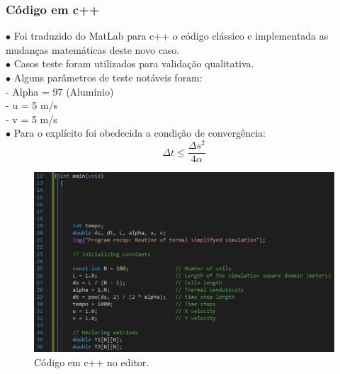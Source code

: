 \documentclass[xcolor=dvipsnames,10pt,aspectratio=169]{beamer}
\begin{document}
	\begin{frame}
		\frametitle{Código em c++}
		\begin{minipage}[h!]{0.49\textwidth}
			$\bullet$ Foi traduzido do MatLab para c++ o código clássico e implementada as mudanças matemáticas deste novo caso.\\
			$\bullet$ Casos teste foram utilizados para validação qualitativa.\\
			$\bullet$ Alguns parâmetros de teste notáveis foram: \\
			- Alpha = 97 (Alumínio) \\
			- u = 5 m/s \\
			- v = 5 m/s \\
			$\bullet$ Para o explícito foi obedecida a condição de convergência:
			\begin{equation}
				\Delta t \leq \frac{\Delta s ^2}{4 \alpha}
			\end{equation}
		\end{minipage}
		\begin{minipage}[h!]{0.49\textwidth}
			\begin{figure}[h!]
				\centering
				\includegraphics[trim = {0cm 1cm 5cm 1cm}, clip , angle=0, scale=0.65]{images/printCodigo1}
				\caption{Código em c++ no editor.}
			\end{figure}
		\end{minipage}
	\end{frame}
\end{document}
